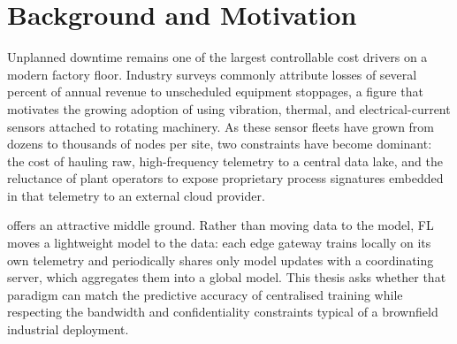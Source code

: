 \section{Background and Motivation}
Unplanned downtime remains one of the largest controllable cost drivers on a modern
factory floor. Industry surveys commonly attribute losses of several percent of annual
revenue to unscheduled equipment stoppages, a figure that motivates the growing adoption
of  using vibration, thermal, and electrical-current
sensors attached to rotating machinery. As these sensor fleets have grown from dozens to
thousands of nodes per site, two constraints have become dominant: the cost of hauling
raw, high-frequency telemetry to a central data lake, and the reluctance of plant
operators to expose proprietary process signatures embedded in that telemetry to an
external cloud provider.

 offers an attractive middle ground. Rather than moving data
to the model, FL moves a lightweight model to the data: each edge gateway trains locally
on its own telemetry and periodically shares only model updates with a coordinating
server, which aggregates them into a global model. This thesis asks whether that
paradigm can match the predictive accuracy of centralised training while respecting the
bandwidth and confidentiality constraints typical of a brownfield industrial deployment.
